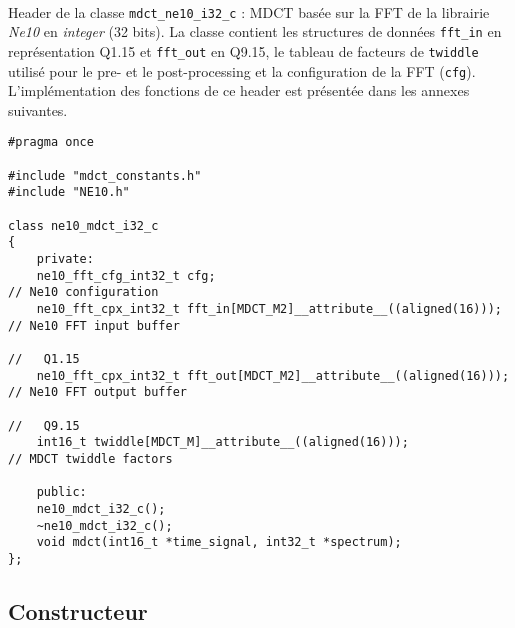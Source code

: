\documentclass{article}
\begin{document}
\paragraph{}
Header de la classe \texttt{mdct\_ne10\_i32\_c} : MDCT basée sur la FFT de la librairie \emph{Ne10} en \emph{integer} (32 bits). La classe contient les structures de données \texttt{fft\_in} en représentation Q1.15 et \texttt{fft\_out} en Q9.15, le tableau de facteurs de \texttt{twiddle} utilisé pour le pre- et le post-processing et la configuration de la FFT (\texttt{cfg}). L'implémentation des fonctions de ce header est présentée dans les annexes suivantes.
\lstset{language=C++}
\begin{lstlisting}
#pragma once

#include "mdct_constants.h"
#include "NE10.h"

class ne10_mdct_i32_c
{
    private:
    ne10_fft_cfg_int32_t cfg;                                          // Ne10 configuration
    ne10_fft_cpx_int32_t fft_in[MDCT_M2]__attribute__((aligned(16)));  // Ne10 FFT input buffer
                                                                       //   Q1.15
    ne10_fft_cpx_int32_t fft_out[MDCT_M2]__attribute__((aligned(16))); // Ne10 FFT output buffer
                                                                       //   Q9.15
    int16_t twiddle[MDCT_M]__attribute__((aligned(16)));               // MDCT twiddle factors

    public:
    ne10_mdct_i32_c();
    ~ne10_mdct_i32_c();
    void mdct(int16_t *time_signal, int32_t *spectrum);
};
\end{lstlisting}

\subsection{Constructeur}\label{app:mdct_ne10_i32_c_constructor}
\end{document}
